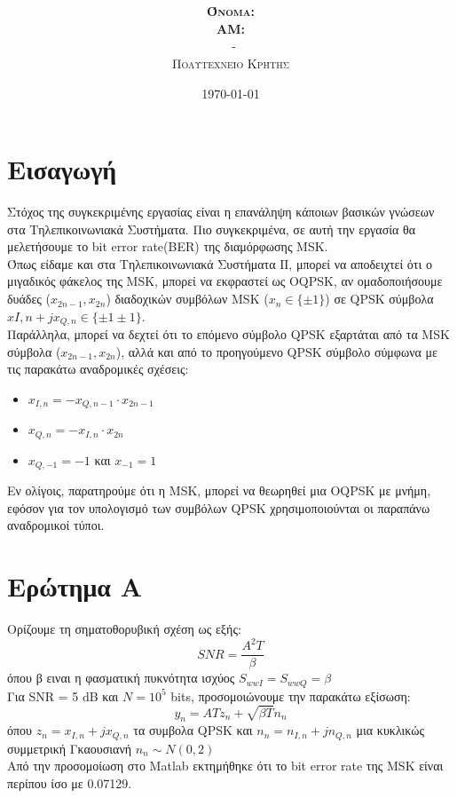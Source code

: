 \documentclass{article}
\title{\underline{\textbf{\assignmentNumber}}}
\author{\textsc{\textbf{Όνομα:}}  \studentName\\
		\textsc{\textbf{ΑΜ:}}  \studentNumber\\
		\course \ - \courseName\\ 
		\textsc{Πολυτεχνείο Κρήτης}
}
\date{\today}
\begin{document}
	\maketitle
\section{Εισαγωγή}
Στόχος της συγκεκριμένης εργασίας είναι η επανάληψη κάποιων βασικών γνώσεων στα Τηλεπικοινωνιακά Συστήματα. Πιο συγκεκριμένα, σε αυτή την εργασία θα μελετήσουμε το bit error rate(BER) της διαμόρφωσης MSK. \\
Όπως είδαμε και στα Τηλεπικοινωνιακά Συστήματα ΙΙ, μπορεί να αποδειχτεί ότι ο μιγαδικός φάκελος της MSK, μπορεί να εκφραστεί ως OQPSK, αν ομαδοποιήσουμε δυάδες ($x_{2n-1},x_{2n}$) διαδοχικών συμβόλων MSK ($x_{n} \in \{\pm1\}$) σε QPSK σύμβολα $x{I,n} + jx_{Q,n} \in \{\pm1 \pm1 \}$. \\
Παράλληλα, μπορεί να δεχτεί ότι το επόμενο σύμβολο QPSK εξαρτάται από τα MSK σύμβολα ($x_{2n-1},x_{2n}$), αλλά και από το προηγούμενο QPSK
σύμβολο σύμφωνα με τις παρακάτω αναδρομικές σχέσεις:
\begin{itemize}
	\item $ x_{I,n} = -x_{Q,n-1} \cdot x_{2n-1}$
	\item $ x_{Q,n} = -x_{I,n} \cdot x_{2n}$	
	\item $ x_{Q,-1} =-1 $ και $x_{-1}=1$
\end{itemize}
Εν ολίγοις, παρατηρούμε ότι η MSK, μπορεί να θεωρηθεί μια OQPSK με μνήμη, εφόσον για τον υπολογισμό των  συμβόλων QPSK χρησιμοποιούνται οι παραπάνω αναδρομικοί τύποι.  

\section{Eρώτημα Α}
Oρίζουμε τη σηματοθορυβική σχέση ως εξής:
$$SNR = \frac{A^2T}{β}$$ 
όπου β ειναι η φασματική πυκνότητα ισχύος $S_{wwI} = S_{wwQ} = β$\\
Για SNR = 5 dB και $Ν=10^5$ bits, προσομοιώνουμε την παρακάτω εξίσωση: 
$$y_{n} = ATz_{n} + \sqrt{βT}n_{n}$$
όπου $z_{n} = x_{I,n} +jx_{Q,n}$ τα συμβολα QPSK και $n_{n} = n_{I,n} +jn_{Q,n}$ μια κυκλικώς συμμετρική Γκαουσιανή $n_{n} \sim N(0,2)$\\
Aπό την προσομοίωση στο Matlab εκτημήθηκε ότι το bit error rate της MSK είναι περίπου ίσο με 0.07129.\\
\end{document}
